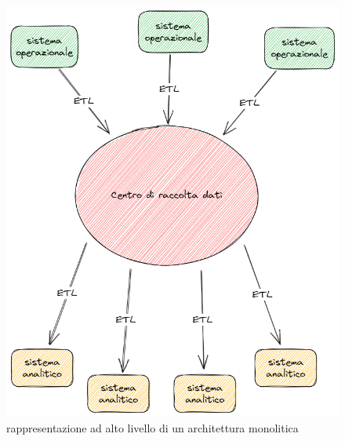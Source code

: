 \documentclass[12pt]{report}
\begin{document}
\begin{figure}[h]
\centering
\includegraphics[scale = 0.4]{immagini/vista architetture centralizzate 2023-07-21 11.27.28.excalidraw.png}
\caption{rappresentazione ad alto livello di un architettura monolitica}
\label{fig:architettura monolitica}
\end{figure}
\end{document}
